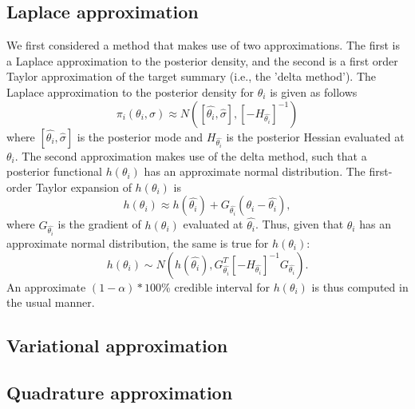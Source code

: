 \documentclass{article}
\begin{document}
\subsection{Laplace approximation}
We first considered a method that makes use of two approximations. The first is a Laplace approximation to the posterior density, and the second is a first order Taylor approximation of the target summary (i.e., the 'delta method'). The Laplace approximation to the posterior density for $\theta_i$ is given as follows
\begin{displaymath}
\pi_i(\theta_i, \sigma) \approx N([\hat{\theta_i},\hat{\sigma}], [-H_{\hat{\theta_i}}]^{-1})
\end{displaymath} 
\noindent where $[\hat{\theta_i},\hat{\sigma}]$ is the posterior mode and $H_{\hat{\theta_i}}$ is the posterior Hessian evaluated at $\theta_i$. The second approximation makes use of the delta method, such that a posterior functional $h(\theta_i)$ has an approximate normal distribution. The first-order Taylor expansion of $h(\theta_i)$ is 
\begin{displaymath}
h(\theta_i) \approx  h(\hat{\theta_i}) + G_{\hat{\theta_i}}(\theta_i - \hat{\theta_i}),
\end{displaymath}
\noindent where $G_{\hat{\theta_i}}$ is the gradient of $h(\theta_i)$ evaluated at $\hat{\theta_i}$. Thus, given that $\theta_i$ has an approximate normal distribution, the same is true for $h(\theta_i)$:
\begin{displaymath}
h(\theta_i) \sim N(h(\hat{\theta_i}), G^T_{\hat{\theta_i}}[-H_{\hat{\theta_i}}]^{-1}G_{\hat{\theta_i}}). 
\end{displaymath}
\noindent An approximate $(1-\alpha)*100$\% credible interval for $h(\theta_i)$ is thus computed in the usual manner. 

\subsection{Variational approximation}
\subsection{Quadrature approximation}
\end{document}
